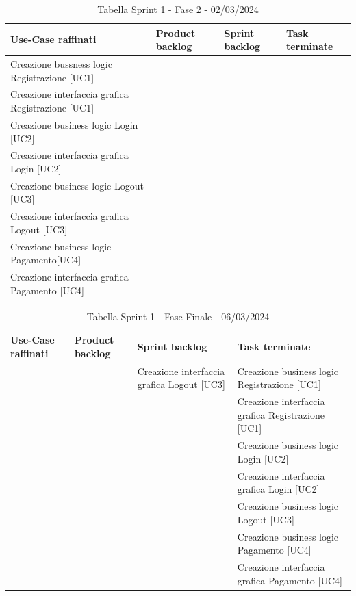 \documentclass{article}
\begin{document}
\begin{table}[h]
    \centering
    \begin{tabularx}{\textwidth}{|X|X|X|X|}
        \hline
        \bf Use-Case raffinati & \bf Product backlog & \bf Sprint backlog & \bf Task terminate \\
        \hline
        Creazione bussness logic Registrazione [UC1] & & & \\
        \hline
        Creazione interfaccia grafica Registrazione [UC1] & & & \\
        \hline
        Creazione business logic Login [UC2] & & & \\
        \hline
        Creazione interfaccia grafica Login [UC2] & &  &  \\
        \hline
        Creazione business logic Logout [UC3] & &  &  \\
        \hline
        Creazione interfaccia grafica Logout [UC3] & &  &  \\
        \hline
        Creazione business logic Pagamento[UC4] & &  &  \\
        \hline
        Creazione interfaccia grafica Pagamento [UC4] & &  &  \\
        \hline
    \end{tabularx}
    \caption*{Tabella Sprint 1 - Fase 2 - 02/03/2024}
\end{table}

\begin{table}[h]
    \centering
    \begin{tabularx}{\textwidth}{|X|X|X|X|}
        \hline
        \bf Use-Case raffinati & \bf Product backlog & \bf Sprint backlog & \bf Task terminate \\
        \hline
        & & Creazione interfaccia grafica Logout [UC3] & Creazione business logic Registrazione [UC1] \\
        \hline
        & & & Creazione interfaccia grafica  Registrazione [UC1] \\
        \hline
        & & & Creazione business logic Login [UC2] \\
        \hline
        & & & Creazione interfaccia grafica Login [UC2] \\
        \hline
        & & & Creazione business logic Logout [UC3] \\
        \hline
        & & & Creazione business logic Pagamento [UC4] \\
        \hline
        & & & Creazione interfaccia grafica Pagamento [UC4] \\
        \hline
    \end{tabularx}
    \caption*{Tabella Sprint 1 - Fase Finale - 06/03/2024}
\end{table}
\end{document}
